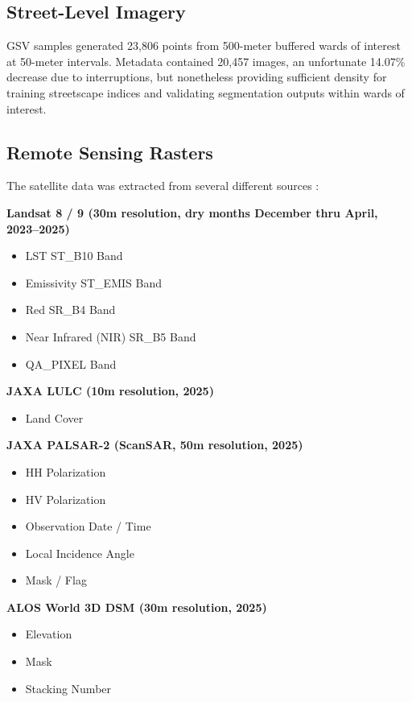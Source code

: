 \documentclass[
]{article}
\providecommand{\tightlist}{%
  \setlength{\itemsep}{0pt}\setlength{\parskip}{0pt}}
\begin{document}
\subsection{Street-Level Imagery}
\label{subsec:gsv}

GSV samples generated 23,806 points from 500-meter buffered wards of interest at 50-meter intervals. Metadata contained 20,457 images, an unfortunate 14.07\% decrease due to interruptions, but nonetheless providing sufficient density for training streetscape indices and validating segmentation outputs within wards of interest.

\subsection{Remote Sensing Rasters}
\label{subsec:rasters}

The satellite data was extracted from several different sources \citep{usgs2024, shimada2014}:

\textbf{Landsat 8 / 9 (30m resolution, dry months December thru April, 2023--2025)}

\begin{itemize}
\item LST ST\_B10 Band
\item Emissivity ST\_EMIS Band
\item Red SR\_B4 Band
\item Near Infrared (NIR) SR\_B5 Band
\item QA\_PIXEL Band
\end{itemize}

\textbf{JAXA LULC (10m resolution, 2025)}

\begin{itemize}
\tightlist
\item Land Cover
\end{itemize}

\textbf{JAXA PALSAR-2 (ScanSAR, 50m resolution, 2025)}

\begin{itemize}
\item HH Polarization
\item HV Polarization
\item Observation Date / Time
\item Local Incidence Angle
\item Mask / Flag
\end{itemize}

\textbf{ALOS World 3D DSM (30m resolution, 2025)}

\begin{itemize}
\item Elevation
\item Mask
\item Stacking Number
\end{itemize}
\end{document}

